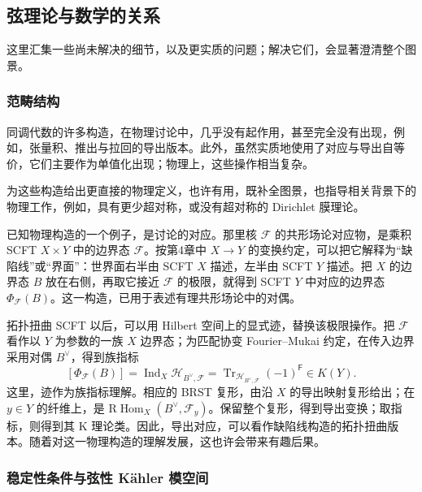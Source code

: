 \subsection{弦理论与数学的关系}\label{sec:5.9.1}

这里汇集一些尚未解决的细节，以及更实质的问题；解决它们，会显著澄清整个图景。

\subsubsection{范畴结构}\label{sec:5.9.1.1}

同调代数的许多构造，在物理讨论中，几乎没有起作用，甚至完全没有出现，例如，张量积、推出与拉回的导出版本。此外，虽然实质地使用了对应与导出自等价，它们主要作为单值化出现；物理上，这些操作相当复杂。

为这些构造给出更直接的物理定义，也许有用，既补全图景，也指导相关背景下的物理工作，例如，具有更少超对称，或没有超对称的 Dirichlet 膜理论。

已知物理构造的一个例子，是讨论的对应。那里核 $\mathcal{F}$ 的共形场论对应物，是乘积 SCFT $X\times Y$ 中的边界态 $\mathcal{F}$。按第4章中 $X\to Y$ 的变换约定，可以把它解释为“缺陷线”或“界面”：世界面右半由 SCFT $X$ 描述，左半由 SCFT $Y$ 描述。把 $X$ 的边界态 $B$ 放在右侧，再取它接近 $\mathcal{F}$ 的极限，就得到 SCFT $Y$ 中对应的边界态 $\Phi_{\mathcal{F}}(B)$。这一构造，已用于表述有理共形场论中的对偶。

拓扑扭曲 SCFT 以后，可以用 Hilbert 空间上的显式迹，替换该极限操作。把 $\mathcal{F}$ 看作以 $Y$ 为参数的一族 $X$ 边界态；为匹配协变 Fourier--Mukai 约定，在传入边界采用对偶 $B^\vee$，得到族指标
\[
[\Phi_{\mathcal{F}}(B)]
=\operatorname{Ind}_X\mathcal{H}_{B^\vee,\mathcal{F}}
=\operatorname{Tr}_{\mathcal{H}_{B^\vee,\mathcal{F}}}(-1)^{\mathsf F}
\in K(Y).
\]
这里，迹作为族指标理解。相应的 BRST 复形，由沿 $X$ 的导出映射复形给出；在 $y\in Y$ 的纤维上，是 $\mathrm{R}\operatorname{Hom}_X(B^\vee,\mathcal{F}_y)$。保留整个复形，得到导出变换；取指标，则得到其 K 理论类。因此，导出对应，可以看作缺陷线构造的拓扑扭曲版本。随着对这一物理构造的理解发展，这也许会带来有趣后果。

\subsubsection{稳定性条件与弦性 K\"ahler 模空间}\label{sec:5.9.1.2}

